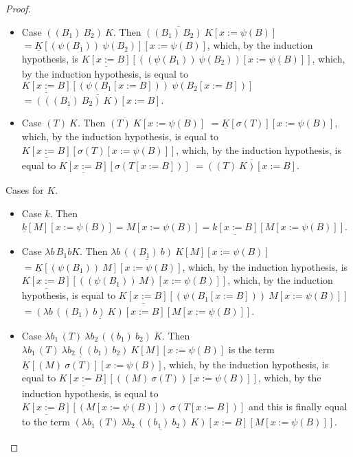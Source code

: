 \documentclass{LMCS}
\begin{document}
\begin{proof}
\begin{myenumerate}
\begin{itemize}
	\item Case $((B_{1})~B_{2})~K$. Then
	  $\overline{((B_{1})~B_{2})~K}[x:=\psi(B)]$
	  $=\underline{K}[(\psi(B_{1}))~\psi(B_{2})][x:=\psi(B)]$,
	  which, by the induction hypothesis, is 
	  $\underline{K[x:=B]}[((\psi(B_{1}))~\psi(B_{2}))[x:=\psi(B)]]$,
	  which, by the induction hypothesis, is equal to
	  $\underline{K[x:=B]}[(\psi(B_{1}[x:=B]))~\psi(B_{2}[x:=B])]$
	  $=\overline{(((B_{1})~B_{2})~K)[x:=B]}$.

	\item Case $(T)~K$. Then 
	  $\overline{(T)~K}[x:=\psi(B)]$
	  $=\underline{K}[\sigma(T)][x:=\psi(B)]$,
	  which, by the induction hypothesis, is equal to
	  $\underline{K[x:=B]}[\sigma(T)[x:=\psi(B)]]$,
	  which, by the induction hypothesis, is equal to
	  $\underline{K[x:=B]}[\sigma(T[x:=B])]$
	  $=\overline{((T)~K)[x:=B]}$.
      \end{itemize}
    \item Cases for $K$.
      \begin{itemize}
	\item Case $k$. Then $\underline{k}[M][x:=\psi(B)]=M[x:=\psi(B)]=\underline{k[x:=B]}[M[x:=\psi(B)]]$.
	\item Case $\lambda b\,B_{1}bK$. Then 
	  $\underline{\lambda b\,((B_{1})~b)~K}[M][x:=\psi(B)]$
	  $=\underline{K}[(\psi(B_{1}))~M][x:=\psi(B)]$,
	  which, by the induction hypothesis, is 
	  $\underline{K[x:=B]}[((\psi(B_{1}))~M)[x:=\psi(B)]]$,
	  which, by the induction hypothesis, is equal to
	  $\underline{K[x:=B]}[(\psi(B_{1}[x:=B]))~M[x:=\psi(B)]]$
	  $=\underline{(\lambda b\,((B_{1})~b)~K)[x:=B]}[M[x:=\psi(B)]]$.

	\item Case $\lambda{b_{1}}\,(T)~\lambda b_2\,((b_{1})~b_{2})~K$. Then
	  $\underline{\lambda b_1\,(T)~\lambda b_2\,((b_{1})~b_{2})~K}[M][x:=\psi(B)]$
	  is the term
	  $\underline{K}[(M)~\sigma(T)][x:=\psi(B)]$,
	  which, by the induction hypothesis, is equal to
	  $\underline{K[x:=B]}[((M)~\sigma(T))[x:=\psi(B)]]$,
	  which, by the induction hypothesis, is equal to
	  $\underline{K[x:=B]}[(M[x:=\psi(B)])~\sigma(T[x:=B])]$
	  and this is finally equal to the term
	  $\underline{(\lambda b_1\,(T)~\lambda b_2\,((b_{1})~b_{2})~K)[x:=B]}[M[x:=\psi(B)]]$.
	  \qedhere
      \end{itemize}
  \end{myenumerate}
\end{proof}
\end{document}
